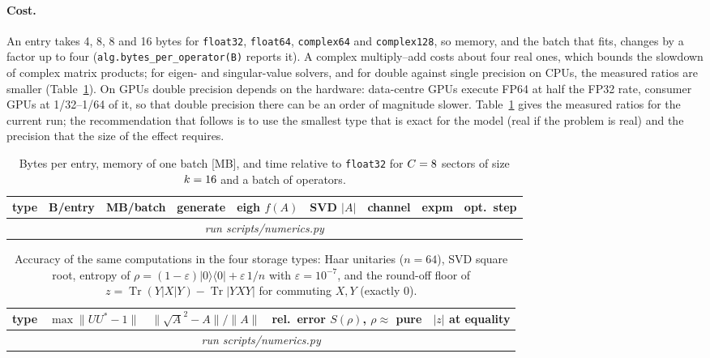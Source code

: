 \documentclass[11pt]{article}
\DeclareMathOperator{\Tr}{Tr}
\providecommand{\NumTimeRows}{\multicolumn{9}{c}{\emph{run scripts/numerics.py}}\\}
\providecommand{\NumAccRows}{\multicolumn{5}{c}{\emph{run scripts/numerics.py}}\\}
\providecommand{\NumTimeHeader}{generate & eigh $f(A)$ & SVD $|A|$ & channel & expm & opt.\ step}
\begin{document}
\paragraph{Cost.} An entry takes 4, 8, 8 and 16 bytes for \texttt{float32}, \texttt{float64},
\texttt{complex64} and \texttt{complex128}, so memory, and the batch that fits, changes by a factor up to four
(\texttt{alg.bytes\_per\_operator(B)} reports it). A complex multiply--add costs about four real ones, which bounds the
slowdown of complex matrix products; for eigen- and singular-value solvers, and for double against single precision
on CPUs, the measured ratios are smaller (Table~\ref{tab:numerics-time}). On GPUs double precision depends on the
hardware: data-centre GPUs execute
FP64 at half the FP32 rate, consumer GPUs at 1/32--1/64 of it, so that double precision there can be an
order of magnitude slower. Table~\ref{tab:numerics-time} gives the measured ratios for the current run;
the recommendation that follows is to use the smallest type that is exact for the model (real if the
problem is real) and the precision that the size of the effect requires.

\begin{table}[h]
\centering\small
\begin{tabular}{lrrrrrrrr}
\toprule
type & B/entry & MB/batch & \NumTimeHeader\\
\midrule
\NumTimeRows
\bottomrule
\end{tabular}
\caption[]{Bytes per entry, memory of one batch [MB], and time relative to \texttt{float32} for $C=\IfFileExists{generated/numerics.tex}{\NumC}{8}$
sectors of size $k=\IfFileExists{generated/numerics.tex}{\NumK}{16}$ and a batch of
 operators.}
\label{tab:numerics-time}
\end{table}

\begin{table}[h]
\centering\small
\begin{tabular}{lcccc}
\toprule
type & $\max\|UU^*-1\|$ & $\|\sqrt A^2-A\|/\|A\|$ & rel.\ error $S(\rho)$, $\rho\approx$ pure & $|z|$ at equality\\
\midrule
\NumAccRows
\bottomrule
\end{tabular}
\caption[]{Accuracy of the same computations in the four storage types: Haar unitaries ($n=64$), SVD square
root, entropy of $\rho=(1-\varepsilon)|0\rangle\langle0|+\varepsilon\,1/n$ with $\varepsilon=10^{-7}$, and the
round-off floor of $z=\Tr(Y|X|Y)-\Tr|YXY|$ for commuting $X,Y$ (exactly $0$).}
\label{tab:numerics-acc}
\end{table}
\end{document}
